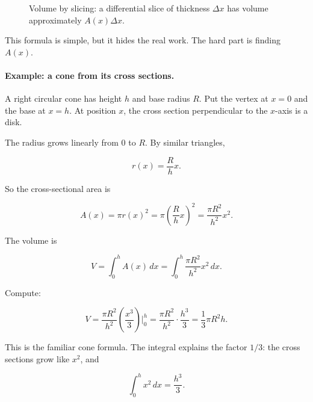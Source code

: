 \begin{figure}[h]
\caption{Volume by slicing: a differential slice of thickness \(\Delta x\) has volume approximately \(A(x)\Delta x\).}
\label{fig:volume-by-slicing-loaf}
\end{figure}

This formula is simple, but it hides the real work.  The hard part is finding \(A(x)\).

\paragraph{Example: a cone from its cross sections.}
A right circular cone has height \(h\) and base radius \(R\).  Put the vertex at \(x=0\)
and the base at \(x=h\).  At position \(x\), the cross section perpendicular to the
\(x\)-axis is a disk.

The radius grows linearly from \(0\) to \(R\).  By similar triangles,

\[
r(x)=\frac{R}{h}x.
\]

So the cross-sectional area is

\[
A(x)=\pi r(x)^2
=
\pi\left(\frac{R}{h}x\right)^2
=
\frac{\pi R^2}{h^2}x^2.
\]

The volume is

\[
V=\int_0^h A(x)\,dx
=
\int_0^h \frac{\pi R^2}{h^2}x^2\,dx.
\]

Compute:

\[
V
=
\frac{\pi R^2}{h^2}
\left(\frac{x^3}{3}\right)\Big|_0^h
=
\frac{\pi R^2}{h^2}\cdot \frac{h^3}{3}
=
\boxed{\frac13\pi R^2h}.
\]

This is the familiar cone formula.  The integral explains the factor \(1/3\): the cross
sections grow like \(x^2\), and

\[
\int_0^h x^2\,dx=\frac{h^3}{3}.
\]

